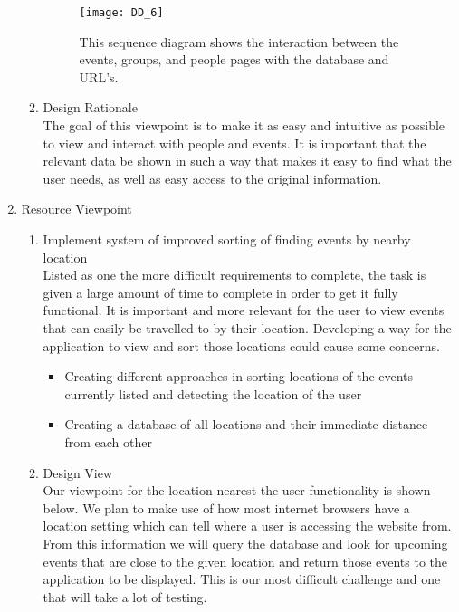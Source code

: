 \documentclass[draftclsnofoot,10pt,onecolumn]{IEEEtran} %
\begin{document}
\begin{enumerate}
\begin{enumerate}
				\begin{figure}[H]
  					\begin{center}
						\texttt{[image: DD\_6]}
						\captionsetup{width=.4\linewidth}
						\centering
  						\caption{This sequence diagram shows the interaction between the events, groups, and people pages with 
  						the database and URL's.}
  					\end{center}
				\end{figure}
				
				\item Design Rationale \\
				The goal of this viewpoint is to make it as easy and intuitive as possible to view and interact with people
				and events. It is important that the relevant data be shown in such a way that makes it easy to find what the
				user needs, as well as easy access to the original information. \\
			\end{enumerate}
			
		\item Resource Viewpoint \\
			\begin{enumerate}
				\item Implement system of improved sorting of finding events by nearby location \\
				Listed as one the more difficult requirements to complete, the task is given a large amount of time to
				complete in order to get it fully functional. It is important and more relevant for the user to view events that
				can easily be travelled to by their location. Developing a way for the application to view and sort those
				locations could cause some concerns.
				\begin{itemize}
					\item Creating different approaches in sorting locations of the events currently listed and detecting the
					location of the user
					\item Creating a database of all locations and their immediate distance from each other \\
				\end{itemize}
				
				\item Design View \\ %
				Our viewpoint for the location nearest the user functionality is shown below. We plan to make use of how
				most internet browsers have a location setting which can tell where a user is accessing the website from.
				From this information we will query the database and look for upcoming events that are close to the given
				location and return those events to the application to be displayed. This is our most difficult challenge and
				one that will take a lot of testing. \\
				

\end{enumerate}
\end{enumerate}
\end{document}
